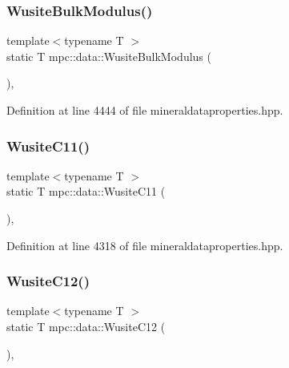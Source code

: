 \subsubsection{\texorpdfstring{Wusite\+Bulk\+Modulus()}{WusiteBulkModulus()}}
{\footnotesize\ttfamily template$<$typename T $>$ \\
static T mpc\+::data\+::\+Wusite\+Bulk\+Modulus (\begin{DoxyParamCaption}{ }\end{DoxyParamCaption})\hspace{0.3cm}{\ttfamily [inline]}, {\ttfamily [static]}}



Definition at line 4444 of file mineraldataproperties.\+hpp.

\mbox{\label{namespacempc_1_1data_a235e10ed6f7c6d5e7618f31f33e7c434}} 
\subsubsection{\texorpdfstring{Wusite\+C11()}{WusiteC11()}}
{\footnotesize\ttfamily template$<$typename T $>$ \\
static T mpc\+::data\+::\+Wusite\+C11 (\begin{DoxyParamCaption}{ }\end{DoxyParamCaption})\hspace{0.3cm}{\ttfamily [inline]}, {\ttfamily [static]}}



Definition at line 4318 of file mineraldataproperties.\+hpp.

\mbox{\label{namespacempc_1_1data_a94ee74c59aa69c77f06430cded8f76dc}} 
\subsubsection{\texorpdfstring{Wusite\+C12()}{WusiteC12()}}
{\footnotesize\ttfamily template$<$typename T $>$ \\
static T mpc\+::data\+::\+Wusite\+C12 (\begin{DoxyParamCaption}{ }\end{DoxyParamCaption})\hspace{0.3cm}{\ttfamily [inline]}, {\ttfamily [static]}}



